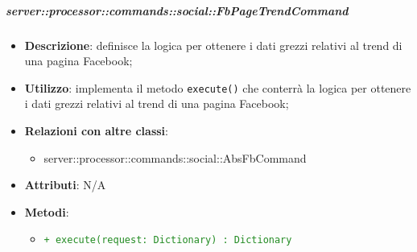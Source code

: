         \subparagraph{server::processor::commands::social::FbPageTrendCommand} %
        \label{subp:bdsm_app_server_processor_commands_social_fbpagetrendcommand}
        \begin{itemize}
          \item \textbf{Descrizione}: definisce la logica per ottenere i dati grezzi relativi al trend di una pagina Facebook;
          \item \textbf{Utilizzo}: implementa il metodo \texttt{execute()} che conterrà la logica per ottenere i dati grezzi relativi al trend di una pagina Facebook;
          \item \textbf{Relazioni con altre classi}:
            \begin{itemize}
              \item server::processor::commands::social::AbsFbCommand
            \end{itemize}
          \item \textbf{Attributi}: N/A
          \item \textbf{Metodi}:
          \begin{itemize}
              \item \textcolor{forestgreen}{\texttt{+ execute(request: Dictionary) : Dictionary}}
          \end{itemize}
        \end{itemize}

